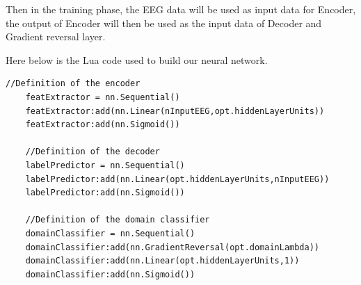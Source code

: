 Then in the training phase, the EEG data will be used as input data for Encoder, the output of Encoder will then be used as the input data of Decoder and Gradient reversal layer.

Here below is the Lua code used to build our neural network.
\begin{lstlisting}[mathescape]
	//Definition of the encoder
	featExtractor = nn.Sequential()
	featExtractor:add(nn.Linear(nInputEEG,opt.hiddenLayerUnits))
	featExtractor:add(nn.Sigmoid())
	
	//Definition of the decoder
	labelPredictor = nn.Sequential()
	labelPredictor:add(nn.Linear(opt.hiddenLayerUnits,nInputEEG))
	labelPredictor:add(nn.Sigmoid())
	
	//Definition of the domain classifier
	domainClassifier = nn.Sequential()
	domainClassifier:add(nn.GradientReversal(opt.domainLambda))
	domainClassifier:add(nn.Linear(opt.hiddenLayerUnits,1))
	domainClassifier:add(nn.Sigmoid())


\end{lstlisting}